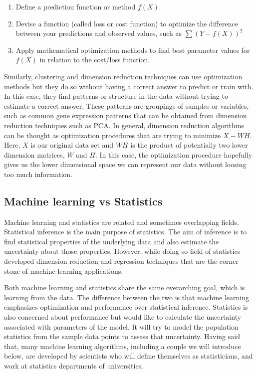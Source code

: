 \documentclass[12pt,]{krantz}
\providecommand{\tightlist}{%
  \setlength{\itemsep}{0pt}\setlength{\parskip}{0pt}}
\begin{document}
\begin{enumerate}
\def\labelenumi{\arabic{enumi})}
\tightlist
\item
  Define a prediction function or method \(f(X)\)
\item
  Devise a function (called loss or cost function) to optimize the difference between your predictions and observed values, such as \(\sum (Y-f(X))^2\)
\item
  Apply mathematical optimization methods to find best parameter values for \(f(X)\) in relation to the cost/loss function.
\end{enumerate}

Similarly, clustering and dimension reduction techniques can use optimization methods but they do so without having a correct answer to predict or train with. In this case, they find patterns or structure in the data without trying to estimate a correct answer. These patterns are groupings of samples or variables, such as common gene expression patterns that can be obtained from dimension reduction techniques such as PCA. In general, dimension reduction algorithms can be thought as optimization procedures that are trying to minimize \(X-WH\). Here, \(X\) is our original data set and \(WH\) is the product of potentially two lower dimension matrices, \(W\) and \(H\). In this case, the optimization procedure hopefully gives us the lower dimensional space we can represent our data without loosing too much information.

\hypertarget{machine-learning-vs-statistics}{%
\subsection{Machine learning vs Statistics}\label{machine-learning-vs-statistics}}

Machine learning and statistics are related and sometimes overlapping fields. Statistical inference is the main purpose of statistics. The aim of inference is to find statistical properties of the underlying data and also estimate the uncertainty about those properties. However, while doing so field of statistics developed dimension reduction and regression techniques that are the corner stone of machine learning applications.

Both machine learning and statistics share the same overarching goal, which is learning from the data.
The difference between the two is that machine learning emphasizes optimization and performance over statistical inference. Statistics is also concerned about performance but would like to calculate the uncertainty associated with parameters of the model. It will try to model the population statistics from the sample data points to assess that uncertainty. Having said that, many machine learning algorithms, including a couple we will introduce below, are developed by scientists who will define themselves as statisticians, and work at statistics departments of universities.
\end{document}
